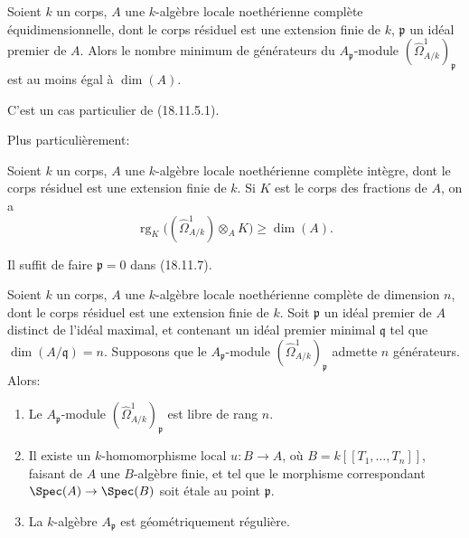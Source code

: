 \begin{corollary}[18.11.7]
\label{IV.18.11.7}
Soient $k$ un corps, $A$ une $k$-algèbre locale noethérienne complète équidimensionnelle, dont le corps résiduel est une extension finie de $k$, $\mathfrak p$ un idéal premier de $A$. Alors le nombre minimum de générateurs du $A_{\mathfrak p}$-module $(\hat{\Omega}^1_{A/k})_{\mathfrak p}$ est au moins égal à $\dim(A)$.
\end{corollary}

C'est un cas particulier de (18.11.5.1).

Plus particulièrement:


\begin{corollary}[18.11.8]
\label{IV.18.11.8}
Soient $k$ un corps, $A$ une $k$-algèbre locale noethérienne complète intègre, dont le corps résiduel est une extension finie de $k$. Si $K$ est le corps des fractions de $A$, on a
\[
  \operatorname{rg}_K\bigl((\hat{\Omega}^1_{A/k})\otimes_A K\bigr)\geq\dim(A).
\]
\end{corollary}

Il suffit de faire $\mathfrak p=0$ dans (18.11.7).

\begin{corollary}[18.11.9]
\label{IV.18.11.9}
Soient $k$ un corps, $A$ une $k$-algèbre locale noethérienne complète de dimension $n$, dont le corps résiduel est une extension finie de $k$. Soit $\mathfrak p$ un idéal premier de $A$ distinct de l'idéal maximal, et contenant un idéal premier minimal $\mathfrak q$ tel que $\dim(A/\mathfrak q)=n$. Supposons que le $A_{\mathfrak p}$-module $(\hat{\Omega}^1_{A/k})_{\mathfrak p}$ admette $n$ générateurs. Alors:
\begin{enumerate}
  \item[(i)] Le $A_{\mathfrak p}$-module $(\hat{\Omega}^1_{A/k})_{\mathfrak p}$ est libre de rang $n$.
  \item[(ii)] Il existe un $k$-homomorphisme local $u:B\to A$, où $B=k[[T_1,\ldots,T_n]]$, faisant de $A$ une $B$-algèbre finie, et tel que le morphisme correspondant $\Spec(A)\to\Spec(B)$ soit étale au point $\mathfrak p$.
  \item[(iii)] La $k$-algèbre $A_{\mathfrak p}$ est géométriquement régulière.
\end{enumerate}
\end{corollary}

